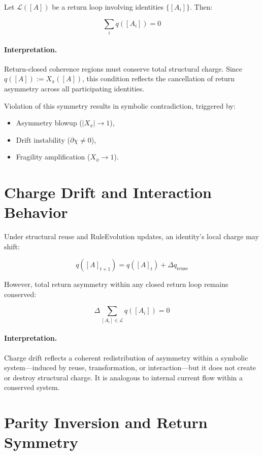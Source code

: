 Let $\mathcal{L}([A])$ be a return loop involving identities $\{[A_i]\}$. Then:

\begin{equation}
\sum_i q([A_i]) = 0
\end{equation}

\paragraph{Interpretation.}
Return-closed coherence regions must conserve total structural charge. Since $q([A]) := X_\pi([A])$, this condition reflects the cancellation of return asymmetry across all participating identities.

Violation of this symmetry results in symbolic contradiction, triggered by:
\begin{itemize}
    \item Asymmetry blowup ($|X_\pi| \to 1$),
    \item Drift instability ($\partial \chi \ne 0$),
    \item Fragility amplification ($X_\phi \to 1$).
\end{itemize}

\section{Charge Drift and Interaction Behavior} \label{sec:charge-drift}

Under structural reuse and RuleEvolution updates, an identity's local charge may shift:

\[
q([A]_{t+1}) = q([A]_t) + \Delta q_{\text{reuse}}
\]

However, total return asymmetry within any closed return loop remains conserved:

\[
\Delta \sum_{[A_i] \in \mathcal{L}} q([A_i]) = 0
\]

\paragraph{Interpretation.}
Charge drift reflects a coherent redistribution of asymmetry within a symbolic system—induced by reuse, transformation, or interaction—but it does not create or destroy structural charge. It is analogous to internal current flow within a conserved system.

\section{Parity Inversion and Return Symmetry} \label{sec:parity}

